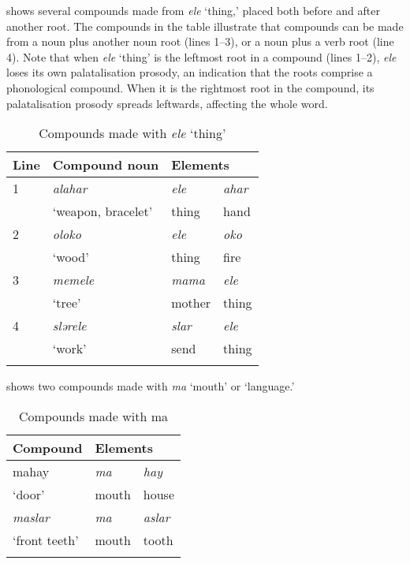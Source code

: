  shows several compounds made from \textit{ele} ‘thing,’ placed both before and after another root. The compounds in the table illustrate that compounds can be made from a noun plus another noun root (lines 1--3), or a noun plus a verb root (line 4). Note that when \textit{ele} ‘thing’ is the leftmost root in a compound (lines 1--2), \textit{ele}  loses its own palatalisation prosody, an indication that the roots comprise a phonological compound. When it is the rightmost root in the compound, its palatalisation prosody spreads leftwards, affecting the whole word.

\begin{table}
\begin{tabular}{lll@{ }l}
\lsptoprule

{Line} & {Compound noun} & \multicolumn{2}{l}{Elements}\\\midrule
1 & \textit{alahar} & \textit{ele} & \textit{ahar} \\
& ‘weapon, bracelet’ & thing & hand\\
2 & \textit{oloko} & \textit{ele} & \textit{oko}\\
& ‘wood’ & thing & fire\\
3 & \textit{memele} & \textit{mama} & \textit{ele} \\
& ‘tree’ & mother & thing\\
4 & \textit{slərele} & \textit{slar} & \textit{ele}\\
& ‘work’ & send & thing\\
\lspbottomrule
\end{tabular}
\caption{Compounds made with \textit{ele} ‘thing’}\label{tab:32}
\end{table}

 shows two compounds made with \textit{ma} ‘mouth’ or ‘language.’

\begin{table}
\begin{tabular}{ll@{ }l}
\lsptoprule
{Compound} & \multicolumn{2}{l}{Elements}\\\midrule
mahay & \textit{ma} & \textit{hay}\\
‘door’ & mouth & house\\\midrule
\textit{maslar } & \textit{ma} & \textit{aslar}\\ 
‘front teeth’  & mouth & tooth\\
\lspbottomrule
\end{tabular}
\caption{Compounds made with ma}\label{tab:33}
\end{table}
 
